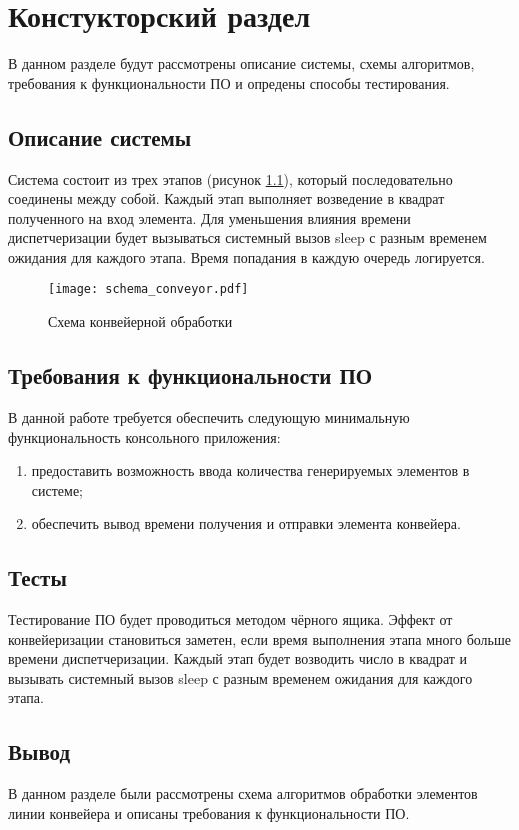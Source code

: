 \chapter{ Констукторский раздел}
\label{cha:design}
        В данном разделе будут рассмотрены описание системы, схемы алгоритмов, требования к функциональности ПО
        и опредены способы тестирования.
    \section{Описание системы}
        Система состоит из трех этапов (рисунок \ref{schema:conveyor}),
        который последовательно соединены между собой. 
        Каждый этап выполняет возведение в квадрат
        полученного на вход элемента. 
        Для уменьшения влияния времени диспетчеризации 
        будет вызываться системный вызов sleep 
        с разным временем ожидания для каждого этапа.
        Время попадания в каждую очередь логируется.

    \begin{figure}[h!]
        \centering
            \texttt{[image: schema\_conveyor.pdf]}
            \caption{Схема конвейерной обработки}
            \label{schema:conveyor}
    \end{figure}


    \section{Требования к функциональности ПО}
        В данной работе требуется обеспечить следующую минимальную функциональность консольного приложения:
        \begin{enumerate}
            \item предоставить возможность ввода количества генерируемых элементов в системе;
            \item обеспечить вывод времени получения и отправки элемента конвейера.
        \end{enumerate}

    \section{Тесты}
        Тестирование ПО будет проводиться методом чёрного ящика. 
        Эффект от конвейеризации становиться заметен,
        если время выполнения этапа много больше времени диспетчеризации. 
        Каждый этап будет возводить число в квадрат и вызывать системный вызов sleep 
        с разным временем ожидания для каждого этапа.

    \section{Вывод}
        В данном разделе были рассмотрены схема алгоритмов 
        обработки элементов линии конвейера и
        описаны требования к функциональности ПО.
        

\newpage